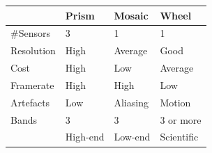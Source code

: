 \documentclass[a4paper, fontsize=8pt, landscape, DIV=1]{scrartcl}
\begin{document}
\begin{multicols*}{4}
		\begin{tabular}{l l l l}
			\hline 
			\hline 
					  &Prism  &Mosaic  &Wheel  \\
			\hline  
			\#Sensors &3  	 &1  	  &1  \\ 
			Resolution&High  &Average &Good  \\ 
			Cost	  &High  &Low	  &Average  \\ 
			Framerate &High  &High	  &Low  \\ 
			Artefacts &Low	 &Aliasing&Motion  \\ 
			Bands	  &3  	 &3  	  &3 or more  \\
					  &High-end &Low-end  &Scientific  \\  
			\hline 
			\hline 
		\end{tabular} 
		\vfill\null
		\columnbreak
		

\end{multicols*}
\end{document}
